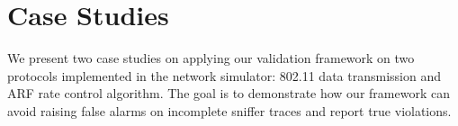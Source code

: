 \section{Case Studies}
\label{sec:case}

We present two case studies on applying our validation framework on two
protocols implemented in the \ns{} network simulator: 802.11 data transmission
and ARF rate control algorithm. The goal is to demonstrate how our framework can
avoid raising false alarms on incomplete sniffer traces and report true
violations.



